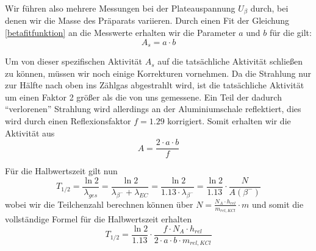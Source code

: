 Wir führen also mehrere Messungen bei der Plateauspannung $U_{\beta}$ durch, bei denen wir die Masse des Präparats variieren. Durch einen Fit der Gleichung \ref{betafitfunktion} an die Messwerte erhalten wir die Parameter $a$ und $b$ für die gilt:
\begin{equation}
 A_s = a \cdot b
\end{equation}

Um von dieser spezifischen Aktivität $A_s$ auf die tatsächliche Aktivität schließen zu können, müssen wir noch einige Korrekturen vornehmen. Da die Strahlung nur zur Hälfte nach oben ins Zählgas abgestrahlt wird, ist die tatsächliche Aktivität um einen Faktor 2 größer als die von uns gemessene. Ein Teil der dadurch "`verlorenen"' Strahlung wird allerdings an der Aluminiumschale reflektiert, dies wird durch einen Reflexionsfaktor $f = 1.29$ korrigiert. Somit erhalten wir die Aktivität aus
\begin{equation}
 A = \frac{2 \cdot a \cdot b}{f}
\end{equation}

Für die Halbwertszeit gilt nun
\begin{equation}
 T_{1/2} = \frac{\ln 2}{\lambda_{ges}} = \frac{\ln 2}{\lambda_{\beta^-} + \lambda_{EC}} = \frac{\ln 2}{1.13 \cdot \lambda_{\beta^-}} = \frac{\ln 2}{1.13} \cdot \frac{N}{A \left( \beta^- \right)}
\end{equation}
wobei wir die Teilchenzahl berechnen können über $N = \frac{N_A \cdot h_{rel}}{m_{rel,KCl}} \cdot m$ und somit die vollständige Formel für die Halbwertszeit erhalten
\begin{equation}
 T_{1/2} = \frac{\ln 2}{1.13} \cdot \frac{f \cdot N_A \cdot h_{rel}}{2 \cdot a \cdot b \cdot m_{rel,KCl}} \label{t12beta}
\end{equation}

